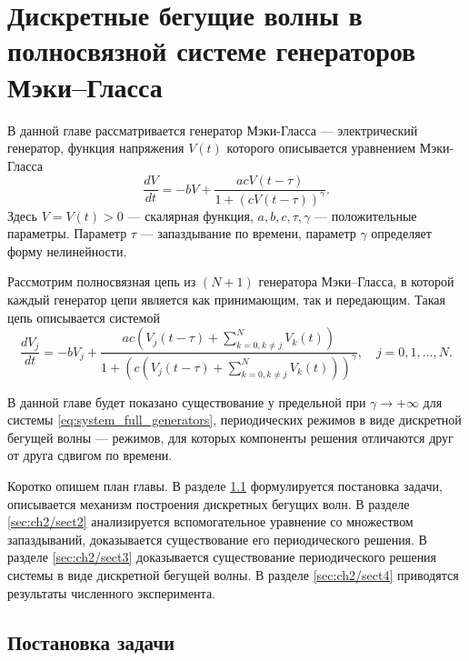 \chapter{Дискретные бегущие волны в полносвязной системе генераторов Мэки--Гласса}\label{ch:ch2}

В данной главе рассматривается генератор Мэки-Гласса --- электрический генератор, функция напряжения $V(t)$ которого описывается уравнением Мэки-Гласса
%
\begin{equation}
	\dfrac{d V}{dt}=
	- bV+\dfrac{acV(t - \tau) }{1 + (cV(t - \tau))^{\gamma}}.
\end{equation}
%
Здесь $V = V(t) > 0$ --- скалярная функция, $a, b, c, \tau, \gamma$ --- положительные параметры. Параметр $\tau$ --- запаздывание по времени, параметр $\gamma$ определяет форму нелинейности.

Рассмотрим полносвязная цепь из $(N + 1)$ генератора Мэки--Гласса, в которой каждый генератор цепи является как принимающим, так и передающим. Такая цепь описывается системой
\small
\begin{equation}
	\label{eq:system_full_generators}
	\dfrac{d V_{j}}{dt}=- bV_{j} + \dfrac{ac\left(V_{j}(t - \tau) + \sum\limits_{k = 0, k\neq j}^{N}V_{k}(t)\right)}{1 + \left(c\left(V_{j}(t - \tau) + \sum\limits_{k = 0, k\neq j}^{N}V_{k}(t)\right)\right)^{\gamma}}, \quad j=0,1,\ldots,N.
\end{equation}
\normalsize

В данной главе будет показано существование у предельной при $\gamma \to +\infty$ для системы \eqref{eq:system_full_generators}, периодических режимов в виде дискретной бегущей волны --- режимов, для которых компоненты решения отличаются друг от друга сдвигом по времени.

Коротко опишем план главы. В разделе \ref{sec:ch2/sect1} формулируется постановка задачи, описывается механизм построения дискретных бегущих волн. В разделе \ref{sec:ch2/sect2} анализируется вспомогательное уравнение со множеством запаздываний, доказывается существование его периодического решения. В разделе \ref{sec:ch2/sect3} доказывается существование периодического решения системы в виде дискретной бегущей волны. В разделе \ref{sec:ch2/sect4} приводятся результаты численного эксперимента.

\section{Постановка задачи}\label{sec:ch2/sect1}

